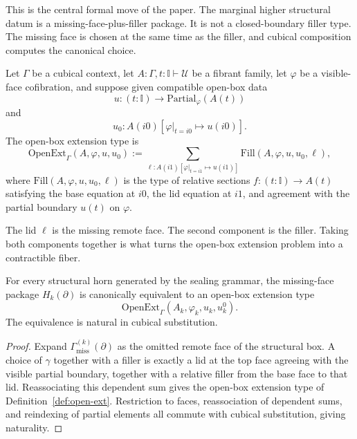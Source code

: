 This is the central formal move of the paper.  The marginal higher structural datum is a
missing-face-plus-filler package.  It is not a closed-boundary filler type.  The missing face is
chosen at the same time as the filler, and cubical composition computes the canonical choice.

\begin{definition}
\label{def:open-ext}
Let \(\Gamma\) be a cubical context, let \(A : \Gamma,t:\mathbb I\vdash \mathcal U\) be a
fibrant family, let \(\varphi\) be a visible-face cofibration, and suppose given compatible
open-box data
\[
  u : (t:\mathbb I) \to \mathrm{Partial}_{\varphi}(A(t))
\]
and
\[
  u_0 : A(i0)[\varphi|_{t=i0}\mapsto u(i0)].
\]
The open-box extension type is
\[
  \mathrm{OpenExt}_{\Gamma}(A,\varphi,u,u_0)
  :=
  \sum_{\ell:A(i1)[\varphi|_{t=i1}\mapsto u(i1)]}
  \mathrm{Fill}(A,\varphi,u,u_0,\ell),
\]
where \(\mathrm{Fill}(A,\varphi,u,u_0,\ell)\) is the type of relative sections
\(f:(t:\mathbb I)\to A(t)\) satisfying the base equation at \(i0\), the lid equation at
\(i1\), and agreement with the partial boundary \(u(t)\) on \(\varphi\).
\end{definition}

The lid \(\ell\) is the missing remote face.  The second component is the filler.  Taking
both components together is what turns the open-box extension problem into a contractible
fiber.

\begin{lemma}
\label{lem:horn-open-box}
For every structural horn generated by the sealing grammar, the missing-face package
\(H_k(\partial)\) is canonically equivalent to an open-box extension type
\[
  \mathrm{OpenExt}_{\Gamma}(A_k,\varphi_k,u_k,u^0_k).
\]
The equivalence is natural in cubical substitution.
\end{lemma}

\begin{proof}
Expand \(\Gamma_{\mathrm{miss}}^{(k)}(\partial)\) as the omitted remote face of the structural
box.  A choice of \(\gamma\) together with a filler is exactly a lid at the top face agreeing
with the visible partial boundary, together with a relative filler from the base face to that
lid.  Reassociating this dependent sum gives the open-box extension type of
Definition~\ref{def:open-ext}.  Restriction to faces, reassociation of dependent sums, and
reindexing of partial elements all commute with cubical substitution, giving naturality.
\end{proof}

